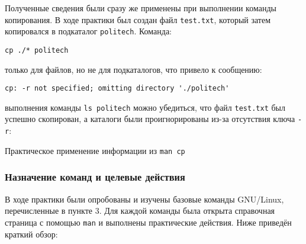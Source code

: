 Полученные сведения были сразу же применены при выполнении команды копирования. В ходе практики был создан файл \texttt{test.txt}, который затем копировался в подкаталог \texttt{politech}. Команда:

\begin{verbatim}
cp ./* politech
\end{verbatim}

 только для файлов, но не для подкаталогов, что привело к сообщению:

\begin{verbatim}
cp: -r not specified; omitting directory './politech'
\end{verbatim}

 выполнения команды \texttt{ls politech} можно убедиться, что файл \texttt{test.txt} был успешно скопирован, а каталоги были проигнорированы из-за отсутствия ключа \texttt{-r}:

{Практическое применение информации из \texttt{man cp}}

\subsubsection*{Назначение команд и целевые действия}

В ходе практики были опробованы и изучены базовые команды GNU/Linux, перечисленные в пункте 3. Для каждой команды была открыта справочная страница с помощью \texttt{man} и выполнены практические действия. Ниже приведён краткий обзор:

